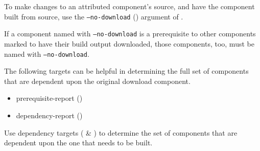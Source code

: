 \begin{enumerate}
  To make changes to an attributed component's source, and have the
  component built from source, use the \texttt{--no-download}
  () argument of \lmsbwcmd.

  If a component named with \texttt{--no-download} is a prerequisite
  to other components marked to have their build output downloaded,
  those components, too, must be named with \texttt{--no-download}.

  The following \lmsbwcmd targets can be helpful in determining the
  full set of components that are dependent upon the original download
  component.

  \begin{itemize}
  \item{prerequisite-report} ()
  \item{dependency-report} ()
  \end{itemize}
\end{enumerate}

Use dependency targets ( \&
) to determine the set of components
that are dependent upon the one that needs to be built.

